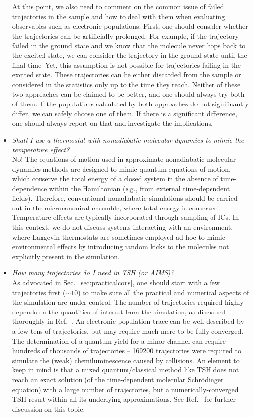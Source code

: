 \documentclass[9pt,bestpractices]{livecoms}
\begin{document}
\begin{itemize}
{At this point, we also need to comment on the common issue of failed trajectories in the sample and how to deal with them when evaluating observables such as electronic populations. First, one should consider whether the trajectories can be artificially prolonged. For example, if the trajectory failed in the ground state and we know that the molecule never hops back to the excited state, we can consider the trajectory in the ground state until the final time. Yet, this assumption is not possible for trajectories failing in the excited state. These trajectories can be either discarded from the sample or considered in the statistics only up to the time they reach. Neither of these two approaches can be claimed to be better, and one should always try both of them. If the populations calculated by both approaches do not significantly differ, we can safely choose one of them. If there is a significant difference, one should always report on that and investigate the implications.
}

\item{\textit{Shall I use a thermostat with nonadiabatic molecular dynamics to mimic the temperature effect?} \\
No! The equations of motion used in approximate nonadiabatic molecular dynamics methods are designed to mimic quantum equations of motion, which conserve the total energy of a closed system in the absence of time-dependence within the Hamiltonian (e.g., from external time-dependent fields). Therefore, conventional nonadiabatic simulations should be carried out in the microcanonical ensemble, where total energy is conserved. Temperature effects are typically incorporated through sampling of ICs. In this context, we do not discuss systems interacting with an environment, where Langevin thermostats are sometimes employed ad hoc to mimic environmental effects by introducing random kicks to the molecules not explicitly present in the simulation. 
}

\item{\textit{How many trajectories do I need in TSH (or AIMS)?} \\
As advocated in Sec.~\ref{sec:practicalcons}, one should start with a few trajectories first ($\sim10$) to make sure all the practical and numerical aspects of the simulation are under control. The number of trajectories required highly depends on the quantities of interest from the simulation, as discussed thoroughly in Ref.~. An electronic population trace can be well described by a few tens of trajectories, but may require much more to be fully converged. The determination of a quantum yield for a minor channel can require hundreds of thousands of trajectories -- 169200 trajectories were required to simulate the (weak) chemiluminescence caused by  collisions.\cite{alvarezbarcia2013chemiluTSH}
An element to keep in mind is that a mixed quantum/classical method like TSH does not reach an exact solution (of the time-dependent molecular Schr\"{o}dinger equation) with a large number of trajectories, but a numerically-converged TSH result within all its underlying approximations. See Ref.~ for further discussion on this topic.
}


\end{itemize}
\end{document}
